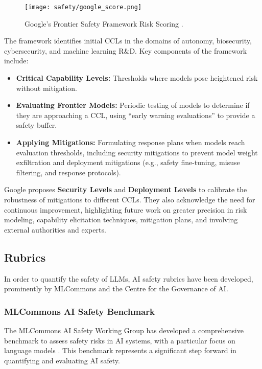 \begin{figure}[H]
\centering
\texttt{[image: safety/google\_score.png]}
\caption{Google's Frontier Safety Framework Risk Scoring \cite{deepmind2024frontier}.}
\label{google-risk-scoring}
\end{figure}

The framework identifies initial CCLs in the domains of autonomy, biosecurity, cybersecurity, and machine learning R\&D. Key components of the framework include:

\begin{itemize}
    \item \textbf{Critical Capability Levels:} Thresholds where models pose heightened risk without mitigation.
    \item \textbf{Evaluating Frontier Models:} Periodic testing of models to determine if they are approaching a CCL, using ``early warning evaluations'' to provide a safety buffer.
    \item \textbf{Applying Mitigations:} Formulating response plans when models reach evaluation thresholds, including security mitigations to prevent model weight exfiltration and deployment mitigations (e.g., safety fine-tuning, misuse filtering, and response protocols).
\end{itemize}

Google proposes \textbf{Security Levels} and \textbf{Deployment Levels} to calibrate the robustness of mitigations to different CCLs. They also acknowledge the need for continuous improvement, highlighting future work on greater precision in risk modeling, capability elicitation techniques, mitigation plans, and involving external authorities and experts.

\subsection{Rubrics}

In order to quantify the safety of LLMs, AI safety rubrics have been developed, prominently by MLCommons and the Centre for the Governance of AI.

\subsubsection{MLCommons AI Safety Benchmark}

The MLCommons AI Safety Working Group has developed a comprehensive benchmark to assess safety risks in AI systems, with a particular focus on language models . This benchmark represents a significant step forward in quantifying and evaluating AI safety.


